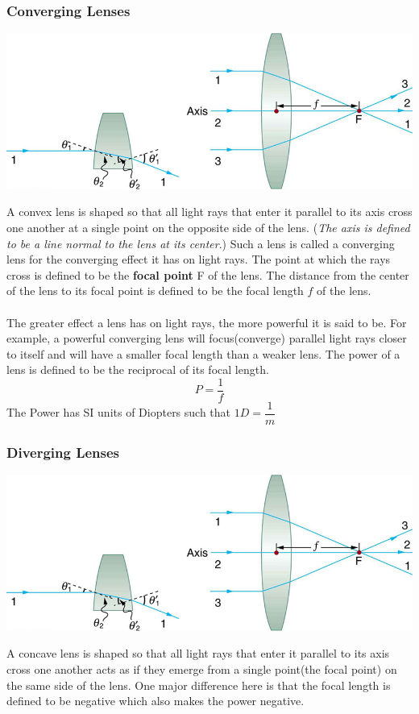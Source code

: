\documentclass[11pt]{article}
\begin{document}
	\subsubsection*{Converging Lenses}
	\begin{center}
		\includegraphics[scale=0.5]{convex_lens}
	\end{center}
	A convex lens is shaped so that all light rays that enter it parallel to its axis cross one another at a single point on the opposite side of the lens. (\textit{The axis is defined to be a line normal to the lens at its center}.) Such a lens is called a converging lens for the converging effect it has on light rays. The point at which the rays cross is defined to be the \textbf{focal point} F of the lens. The distance from the center of the lens to its focal point is defined to be the focal length $f$ of the lens. \\ \\
	The greater effect a lens has on light rays, the more powerful it is said to be. For example, a powerful converging lens will focus(converge) parallel light rays closer to itself and will have a smaller focal length than a weaker lens. The power of a lens is defined to be the reciprocal of its focal length.
	$$P=\dfrac{1}{f}$$
	The Power has SI units of Diopters such that $1D = \dfrac{1}{m}$ 
	\subsubsection*{Diverging Lenses}
	\begin{center}
		\includegraphics[scale=0.5]{convex_lens}
	\end{center}
	A concave lens is shaped so that all light rays that enter it parallel to its axis cross one another acts as if they emerge from a single point(the focal point) on the same side of the lens. One major difference here is that the focal length is defined to be negative which also makes the power negative.
\end{document}
